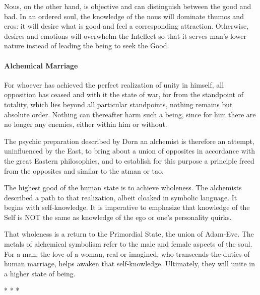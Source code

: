 Nous, on the other hand, is objective and can distinguish between the good and bad. In an ordered soul, the knowledge of the nous will dominate thumos and eros: it will desire what is good and feel a corresponding attraction. Otherwise, desires and emotions will overwhelm the Intellect so that it serves man's lower nature instead of leading the being to seek the Good.

\paragraph{Alchemical Marriage}


\begin{quotex}
For whoever has achieved the perfect realization of unity in himself, all opposition has ceased and with it the state of war, for from the standpoint of totality, which lies beyond all particular standpoints, nothing remains but absolute order. Nothing can thereafter harm such a being, since for him there are no longer any enemies, either within him or without.

The psychic preparation described by Dorn an alchemist is therefore an attempt, uninfluenced by the East, to bring about a union of opposites in accordance with the great Eastern philosophies, and to establish for this purpose a principle freed from the opposites and similar to the atman or tao.
\end{quotex}


The highest good of the human state is to achieve wholeness. The alchemists described a path to that realization, albeit cloaked in symbolic language. It begins with self-knowledge. It is imperative to emphasize that knowledge of the Self is NOT the same as knowledge of the ego or one's personality quirks.

That wholeness is a return to the Primordial State, the union of Adam-Eve. The metals of alchemical symbolism refer to the male and female aspects of the soul. For a man, the love of a woman, real or imagined, who transcends the duties of human marriage, helps awaken that self-knowledge. Ultimately, they will unite in a higher state of being.



\begin{center}* * *\end{center}

